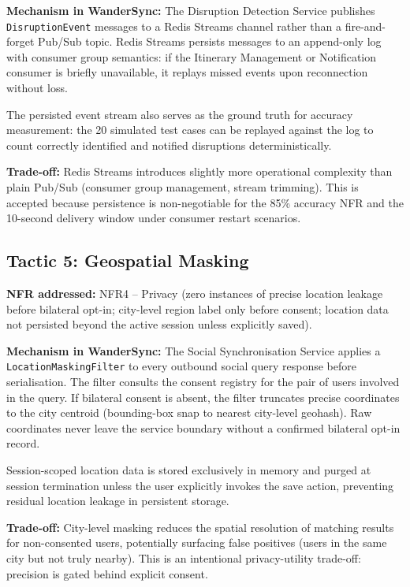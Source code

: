 \documentclass[12pt,a4paper]{article}
\begin{document}
\textbf{Mechanism in WanderSync:}
The Disruption Detection Service publishes \texttt{DisruptionEvent} messages to a Redis Streams
channel rather than a fire-and-forget Pub/Sub topic. Redis Streams persists messages to an
append-only log with consumer group semantics: if the Itinerary Management or Notification
consumer is briefly unavailable, it replays missed events upon reconnection without loss.

The persisted event stream also serves as the ground truth for accuracy measurement: the 20
simulated test cases can be replayed against the log to count correctly identified and notified
disruptions deterministically.

\textbf{Trade-off:} Redis Streams introduces slightly more operational complexity than plain
Pub/Sub (consumer group management, stream trimming). This is accepted because persistence is
non-negotiable for the 85\% accuracy NFR and the 10-second delivery window under consumer
restart scenarios.

\subsection{Tactic 5: Geospatial Masking}

\textbf{NFR addressed:} NFR4 -- Privacy (zero instances of precise location leakage before
bilateral opt-in; city-level region label only before consent; location data not persisted beyond
the active session unless explicitly saved).

\textbf{Mechanism in WanderSync:}
The Social Synchronisation Service applies a \texttt{LocationMaskingFilter} to every outbound
social query response before serialisation. The filter consults the consent registry for the pair
of users involved in the query. If bilateral consent is absent, the filter truncates precise
coordinates to the city centroid (bounding-box snap to nearest city-level geohash). Raw
coordinates never leave the service boundary without a confirmed bilateral opt-in record.

Session-scoped location data is stored exclusively in memory and purged at session termination
unless the user explicitly invokes the save action, preventing residual location leakage in
persistent storage.

\textbf{Trade-off:} City-level masking reduces the spatial resolution of matching results for
non-consented users, potentially surfacing false positives (users in the same city but not truly
nearby). This is an intentional privacy-utility trade-off: precision is gated behind explicit
consent.
\end{document}
